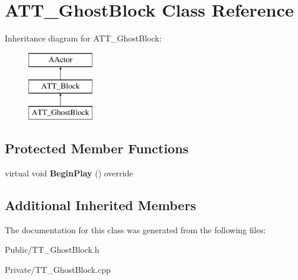 \hypertarget{class_a_t_t___ghost_block}{}\section{A\+T\+T\+\_\+\+Ghost\+Block Class Reference}
\label{class_a_t_t___ghost_block}
Inheritance diagram for A\+T\+T\+\_\+\+Ghost\+Block\+:\begin{figure}[H]
\begin{center}
\leavevmode
\includegraphics[height=3.000000cm]{class_a_t_t___ghost_block}
\end{center}
\end{figure}
\subsection*{Protected Member Functions}
\begin{DoxyCompactItemize}
\item 
\mbox{\label{class_a_t_t___ghost_block_a9b2b2d25516121182d04ade031cd17f8}} 
virtual void {\bfseries Begin\+Play} () override
\end{DoxyCompactItemize}
\subsection*{Additional Inherited Members}


The documentation for this class was generated from the following files\+:\begin{DoxyCompactItemize}
\item 
Public/T\+T\+\_\+\+Ghost\+Block.\+h\item 
Private/T\+T\+\_\+\+Ghost\+Block.\+cpp\end{DoxyCompactItemize}
